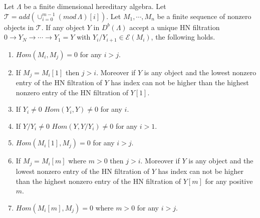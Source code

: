 \begin{lemma}\label{lem:C3L2}
Let $\Lambda$ be a finite dimensional hereditary algebra. Let $\mathcal{T} = add(\cup_{i=0}^{m-1} (mod\,\Lambda)[i])$. Let $M_1,\cdots, M_n$ be a finite sequence of nonzero objects in $\mathcal{T}$. If any object $Y$ in $D^b(\Lambda)$ accept a unique HN filtration $0\to Y_N\to\cdots\to Y_1=Y$ with $Y_i/Y_{i+1}\in \mathcal{E}(M_i)$, the following holds.
\begin{enumerate}
\item $Hom(M_i,M_j) = 0$ for any $i>j$.
\item If $M_j = M_i[1]$ then $j>i$. Moreover if $Y$ is any object and the lowest nonzero entry of the HN filtration of $Y$ has index can not be higher than the highest nonzero entry of the HN filtration of $Y[1]$. 
\item If $Y_i\neq 0$ $Hom(Y_i, Y)\neq 0$ for any $i$.
\item If $Y/Y_i\neq 0$ $Hom(Y, Y/Y_i)\neq 0$ for any $i>1$.
\item $Hom(M_i[1],M_j) = 0$ for any $i>j$.
\item If $M_j = M_i[m]$ where $m>0$ then $j>i$. Moreover if $Y$ is any object and the lowest nonzero entry of the HN filtration of $Y$ has index can not be higher than the highest nonzero entry of the HN filtration of $Y[m]$ for any positive $m$. 
\item $Hom(M_i[m],M_j) = 0$ where $m>0$ for any $i>j$.
\end{enumerate}
\end{lemma}
